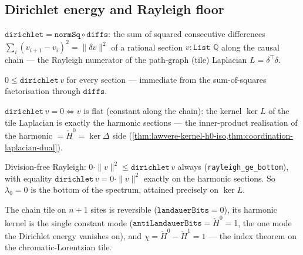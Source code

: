 \subsection{Dirichlet energy and Rayleigh floor}

\begin{proposition}\label{thm:tile-dirichlet}\leanok{}
$\texttt{dirichlet}=\texttt{normSq}\circ\texttt{diffs}$: the sum of squared consecutive differences
$\sum_i(v_{i+1}-v_i)^2=\|\delta v\|^2$ of a rational section $v:\texttt{List }\mathbb Q$ along the
causal chain --- the Rayleigh numerator of the path-graph (tile) Laplacian $L=\delta^\top\delta$.
\end{proposition}

\begin{theorem}\label{thm:tile-laplacian-psd}\leanok{}
$0\le\texttt{dirichlet}\,v$ for every section --- immediate from the sum-of-squares factorisation
through $\texttt{diffs}$.
\end{theorem}

\begin{theorem}\label{thm:tile-rayleigh-harmonic}\leanok{}
$\texttt{dirichlet}\,v=0\iff v$ is flat (constant along the chain): the kernel $\ker L$ of the tile
Laplacian is exactly the harmonic sections --- the inner-product realisation of the harmonic
$=\check H^0=\ker\Delta$ side (\cref{thm:lawvere-kernel-h0-iso,thm:coordination-laplacian-dual}).
\end{theorem}

\begin{theorem}[Rayleigh bottom eigenpair $(\lambda_0=0,\ker L)$]\label{thm:tile-rayleigh-bottom}\leanok{}
Division-free Rayleigh: $0\cdot\|v\|^2\le\texttt{dirichlet}\,v$ always
(\texttt{rayleigh\_ge\_bottom}), with equality $\texttt{dirichlet}\,v=0\cdot\|v\|^2$ exactly on the
harmonic sections. So $\lambda_0=0$ is the bottom of the spectrum, attained precisely on $\ker L$.
\end{theorem}

\begin{theorem}\label{thm:chromatic-tile-index}\leanok{}
The chain tile on $n+1$ sites is reversible ($\texttt{landauerBits}=0$), its harmonic kernel is the
single constant mode ($\texttt{antiLandauerBits}=\check H^0=1$, the one mode the Dirichlet energy
vanishes on), and $\chi=\check H^0-\check H^1=1$ --- the index theorem on the chromatic-Lorentzian
tile.
\end{theorem}

